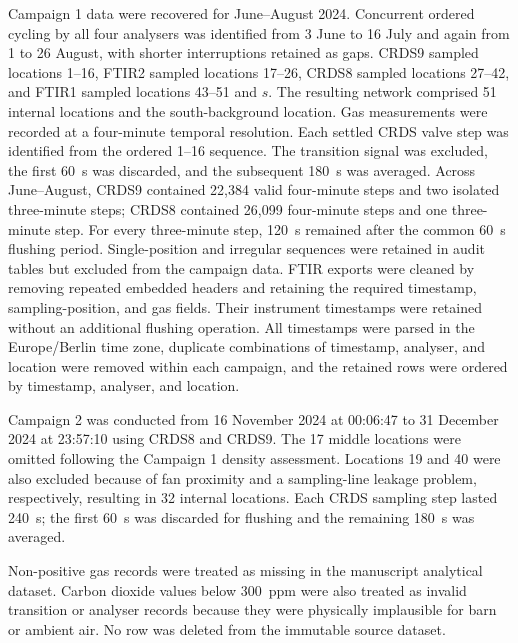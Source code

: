 \documentclass[12pt,a4paper]{article}
\begin{document}
Campaign 1 data were recovered for June--August 2024. Concurrent ordered
cycling by all four analysers was identified from 3 June to 16 July and again
from 1 to 26 August, with shorter interruptions retained as gaps. CRDS9
sampled locations 1--16, FTIR2 sampled locations 17--26,
CRDS8 sampled locations 27--42, and FTIR1 sampled locations 43--51 and \(s\).
The resulting network comprised 51 internal locations and the
south-background location. Gas measurements were recorded at a four-minute
temporal resolution. Each settled CRDS valve step was identified from the
ordered 1--16 sequence. The transition signal was excluded, the first
\SI{60}{s} was discarded, and the subsequent \SI{180}{s} was averaged.
Across June--August, CRDS9 contained 22,384 valid four-minute steps and two
isolated three-minute steps; CRDS8 contained 26,099 four-minute steps and one
three-minute step. For every three-minute step, \SI{120}{s} remained after
the common \SI{60}{s} flushing period. Single-position and irregular
sequences were retained in audit tables but excluded from the campaign data.
FTIR exports were cleaned by removing repeated embedded headers and retaining
the required timestamp, sampling-position, and gas fields. Their instrument
timestamps were retained without an additional flushing operation. All
timestamps were parsed in the Europe/Berlin time zone, duplicate combinations
of timestamp, analyser, and location were removed within each campaign, and
the retained rows were ordered by timestamp, analyser, and location.

Campaign 2 was conducted from 16 November 2024 at 00:06:47 to 31 December
2024 at 23:57:10 using CRDS8 and CRDS9. The 17 middle locations were omitted
following the Campaign 1 density assessment. Locations 19 and 40 were also
excluded because of fan proximity and a sampling-line leakage problem,
respectively, resulting in 32 internal locations. Each CRDS sampling step
lasted \SI{240}{s}; the first \SI{60}{s} was discarded for flushing and the
remaining \SI{180}{s} was averaged.

Non-positive gas records were treated as missing in the manuscript analytical
dataset. Carbon dioxide values below \SI{300}{ppm} were also treated as
invalid transition or analyser records because they were physically
implausible for barn or ambient air. No row was deleted from the immutable
source dataset.
\end{document}
